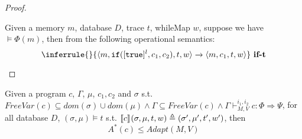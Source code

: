 \documentclass[a4paper,11pt]{article}
\begin{document}
\begin{proof}
\begin{itemize}
Given a memory $m$, database $D$, trace $t$, whileMap $w$, suppose we have $\vDash \Phi(m)$, then from the following operational semantics:
\[
\inferrule
{
}
{
\config{m, \eif([\etrue]^l, c_1, c_2),t,w} 
\xrightarrow{} \config{m, c_1,  t,w}
}
~\textbf{if-t}
\]



\end{itemize}
\end{proof}

\begin{thm}
[Soundness]
Given a program $c$, $\Gamma$, $\mu$, $c_1, c_2$ and $\sigma$ s.t. $
FreeVar(c) \subseteq dom(\sigma) \cup dom(\mu)  
\land \Gamma \subseteq FreeVar(c) 
\land \Gamma \vdash_{M,V}^{i_1,i_2} c : \Phi \Rightarrow \Psi$,
 for all database $D$, $(\sigma, \mu) \vDash t$ s.t. 
$\llbracket c \rrbracket_{} (\sigma, \mu , t ,w )  \triangleq  (\sigma' , \mu' , t', w' )$,
then
\[
A^*(c) \leq Adapt(M, V)
\]
\end{thm}
\end{document}
